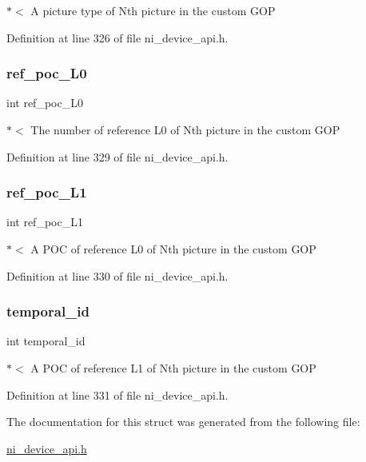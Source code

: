 $\ast$$<$ A picture type of Nth picture in the custom G\+OP 

Definition at line 326 of file ni\+\_\+device\+\_\+api.\+h.

\mbox{\label{struct__ni__gop__params_a65a17d11c1bb6266ef249d85a9c3af67}} 
\subsubsection{\texorpdfstring{ref\_poc\_L0}{ref\_poc\_L0}}
{\footnotesize\ttfamily int ref\+\_\+poc\+\_\+\+L0}

$\ast$$<$ The number of reference L0 of Nth picture in the custom G\+OP 

Definition at line 329 of file ni\+\_\+device\+\_\+api.\+h.

\mbox{\label{struct__ni__gop__params_ad4dc226bc0b6da8e4a82fbc49f52b755}} 
\subsubsection{\texorpdfstring{ref\_poc\_L1}{ref\_poc\_L1}}
{\footnotesize\ttfamily int ref\+\_\+poc\+\_\+\+L1}

$\ast$$<$ A P\+OC of reference L0 of Nth picture in the custom G\+OP 

Definition at line 330 of file ni\+\_\+device\+\_\+api.\+h.

\mbox{\label{struct__ni__gop__params_ac5ddfc6b85761655c1f00e9364aa9f0f}} 
\subsubsection{\texorpdfstring{temporal\_id}{temporal\_id}}
{\footnotesize\ttfamily int temporal\+\_\+id}

$\ast$$<$ A P\+OC of reference L1 of Nth picture in the custom G\+OP 

Definition at line 331 of file ni\+\_\+device\+\_\+api.\+h.



The documentation for this struct was generated from the following file\+:\begin{DoxyCompactItemize}
\item 
\mbox{\hyperlink{ni__device__api_8h}{ni\+\_\+device\+\_\+api.\+h}}\end{DoxyCompactItemize}
